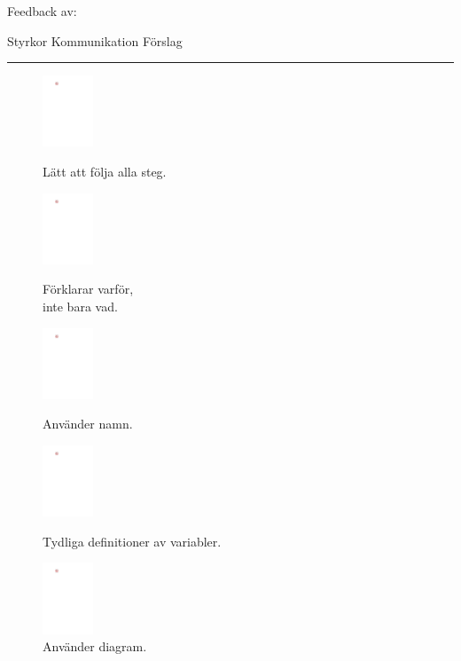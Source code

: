 \begin{questions}



\newpage
\begin{center}
  Feedback av:\enspace\makebox[2in]{\hrulefill}\\
\end{center}

\smallskip
\noindent Styrkor \hfill Kommunikation \hfill Förslag \hrule

\begin{figure}[H]
    \centering
    \includegraphics[width=1.5cm, page=3]{img/Bilder.pdf}
    \caption*{Lätt att följa alla steg.}
    \includegraphics[width=1.5cm, page=2]{img/Bilder.pdf}
    \caption*{Förklarar varför,\\ inte bara vad.}
    \includegraphics[width=1.5cm, page=1]{img/Bilder.pdf}
    \caption*{Använder namn.}
    \includegraphics[width=1.5cm, page=5]{img/Bilder.pdf}
    \caption*{Tydliga definitioner av variabler.}
    \includegraphics[width=1.5cm, page=6]{img/Bilder.pdf}
    \caption*{Använder diagram.}
\end{figure}


\end{questions}
